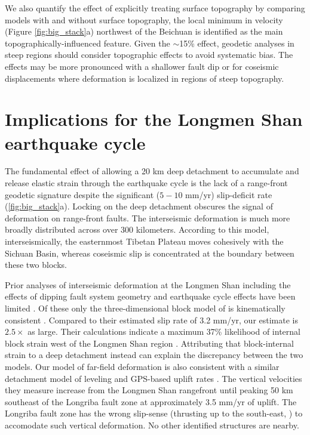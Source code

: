 \documentclass[draft,jgrga]{agutex}
\begin{document}
\begin{article}
We also quantify the effect of explicitly treating surface topography by comparing models with and without surface topography, the local minimum in velocity (Figure \ref{fig:big_stack}a) northwest of the Beichuan is identified as the main topographically-influenced feature. Given the ${\sim}$15\% effect, geodetic analyses in steep regions should consider topographic effects to avoid systematic bias. The effects may be more pronounced with a shallower fault dip or for coseismic displacements where deformation is localized in regions of steep topography.

\section{Implications for the Longmen Shan earthquake cycle}
The fundamental effect of allowing a 20 km deep detachment to accumulate and release elastic strain through the earthquake cycle is the lack of a range-front geodetic signature despite the significant ($5-10$ mm/yr) slip-deficit rate (\ref{fig:big_stack}a). Locking on the deep detachment obscures the signal of deformation on range-front faults. The interseismic deformation is much more broadly distributed across over 300 kilometers. According to this model, interseismically, the easternmost Tibetan Plateau moves cohesively with the Sichuan Basin, whereas coseismic slip is concentrated at the boundary between these two blocks.

Prior analyses of interseismic deformation at the Longmen Shan including the effects of dipping fault system geometry and earthquake cycle effects have been limited \citep{Loveless2011, Qi2011, Hao2014}. Of these only the three-dimensional block model of \citet{Loveless2011} is kinematically consistent \citep{minster87,mccaffrey02,Meade2005}. Compared to their estimated slip rate of 3.2 mm/yr, our estimate is $2.5 \times$ as large.  Their calculations indicate a maximum 37\% likelihood of internal block strain west of the Longmen Shan region \citep{Loveless2011}. Attributing that block-internal strain to a deep detachment instead can explain the discrepancy between the two models. Our model of far-field deformation is also consistent with a similar detachment model of leveling and GPS-based uplift rates \citep{Hao2014}. The vertical velocities they measure increase from the Longmen Shan rangefront until peaking 50 km southeast of the Longriba fault zone at approximately 3.5 mm/yr of uplift. The Longriba fault zone has the wrong slip-sense (thrusting up to the south-east, \citep{Ren2013}) to accomodate such vertical deformation. No other identified structures are nearby. 


\end{article}
\end{document}
